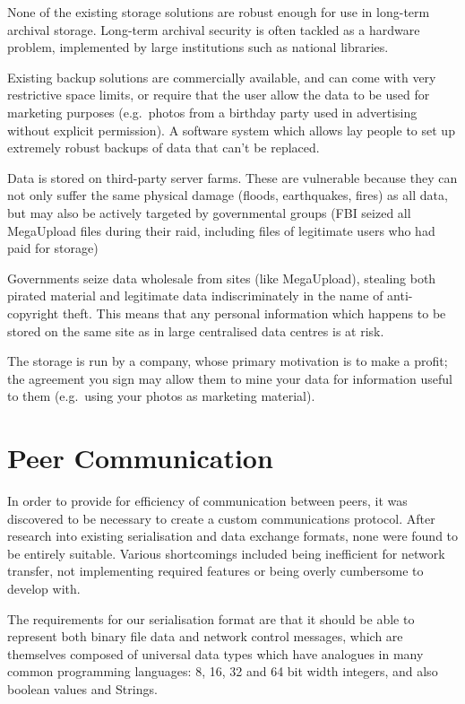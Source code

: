 \documentclass[12pt,a4paper,]{adreport}
\begin{document}
None of the existing storage solutions are robust enough for use in
long-term archival storage. Long-term archival security is often tackled
as a hardware problem, implemented by large institutions such as
national libraries.

Existing backup solutions are commercially available, and can come with
very restrictive space limits, or require that the user allow the data
to be used for marketing purposes (e.g.~photos from a birthday party
used in advertising without explicit permission). A software system
which allows lay people to set up extremely robust backups of data that
can't be replaced.

Data is stored on third-party server farms. These are vulnerable because
they can not only suffer the same physical damage (floods, earthquakes,
fires) as all data, but may also be actively targeted by governmental
groups (FBI seized all MegaUpload files during their raid, including
files of legitimate users who had paid for storage)

Governments seize data wholesale from sites (like MegaUpload), stealing
both pirated material and legitimate data indiscriminately in the name
of anti-copyright theft. This means that any personal information which
happens to be stored on the same site as in large centralised data
centres is at risk.

The storage is run by a company, whose primary motivation is to make a
profit; the agreement you sign may allow them to mine your data for
information useful to them (e.g.~using your photos as marketing
material).

\section{Peer Communication}\label{peer-communication}

In order to provide for efficiency of communication between peers, it
was discovered to be necessary to create a custom communications
protocol. After research into existing serialisation and data exchange
formats, none were found to be entirely suitable. Various shortcomings
included being inefficient for network transfer, not implementing
required features or being overly cumbersome to develop with.

The requirements for our serialisation format are that it should be able
to represent both binary file data and network control messages, which
are themselves composed of universal data types which have analogues in
many common programming languages: 8, 16, 32 and 64 bit width integers,
and also boolean values and Strings.
\end{document}
